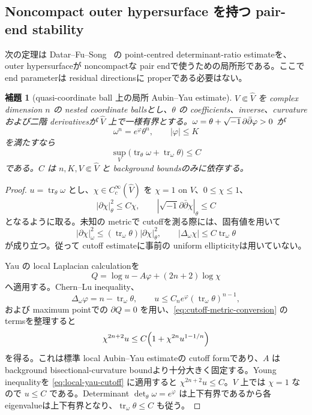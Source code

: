 \documentclass[11pt,a4paper]{ltjsarticle}
\newcommand{\tr}{\operatorname{tr}}\newcommand{\id}{\operatorname{id}}
\theoremstyle{plain}
\newtheorem{lemma}[theorem]{補題}\newtheorem{corollary}[theorem]{系}
\theoremstyle{definition}
\theoremstyle{remark}
\begin{document}
\subsection{Noncompact outer hypersurface を持つ pair-end stability}
次の定理は Datar--Fu--Song~\cite{DFS} の point-centred determinant-ratio estimateを、outer hypersurfaceが noncompactな pair endで使うための局所形である。ここで end parameterは residual directionsに properである必要はない。

\begin{lemma}[quasi-coordinate ball 上の局所 Aubin--Yau estimate]\label{lem:local-aubin-yau}
$V\Subset\widehat V$ を complex dimension $n$ の nested coordinate ballsとし、$\theta$ の coefficients、inverse、curvatureおよび二階 derivativesが $\widehat V$ 上で一様有界とする。$\omega=\theta+\sqrt{-1}\,\partial\bar\partial\varphi>0$ が
\[
 \omega^n=e^{\varphi}\theta^n,
 \qquad |\varphi|\le K
\]
を満たすなら
\[
 \sup_V\bigl(\tr_\theta\omega+\tr_\omega\theta\bigr)\le C
\]
である。$C$ は $n,K,V\Subset\widehat V$ と background boundsのみに依存する。
\end{lemma}

\begin{proof}
$u=\tr_\theta\omega$ とし、$\chi\in C_c^\infty(\widehat V)$ を $\chi=1$ on $V$、$0\le\chi\le1$、
\[
 |\partial\chi|_\theta^2\le C\chi,
 \qquad
 |\sqrt{-1}\partial\bar\partial\chi|_\theta\le C
\]
となるように取る。未知の metricで cutoffを測る際には、固有値を用いて
\begin{equation}\label{eq:cutoff-metric-conversion}
 |\partial\chi|_\omega^2
 \le (\tr_\omega\theta)|\partial\chi|_\theta^2,
 \qquad
 |\Delta_\omega\chi|
 \le C\tr_\omega\theta
\end{equation}
が成り立つ。従って cutoff estimateに事前の uniform ellipticityは用いていない。

Yau の local Laplacian calculationを
\[
 Q=\log u-A\varphi+(2n+2)\log\chi
\]
へ適用する。Chern--Lu inequality、
\[
 \Delta_\omega\varphi=n-\tr_\omega\theta,
 \qquad
 u\le C_n e^{\varphi}(\tr_\omega\theta)^{n-1},
\]
および maximum pointでの $\partial Q=0$ を用い、\eqref{eq:cutoff-metric-conversion} の termsを整理すると
\begin{equation}\label{eq:local-yau-cutoff}
 \chi^{2n+2}u
 \le C\Bigl(1+\chi^{2n}u^{1-1/n}\Bigr)
\end{equation}
を得る。これは標準 local Aubin--Yau estimateの cutoff formであり、$A$ は background bisectional-curvature boundより十分大きく固定する。Young inequalityを \eqref{eq:local-yau-cutoff} に適用すると $\chi^{2n+2}u\le C$。$V$ 上では $\chi=1$ なので $u\le C$ である。Determinant $\det_\theta\omega=e^{\varphi}$ は上下有界であるから各 eigenvalueは上下有界となり、$\tr_\omega\theta\le C$ も従う。
\end{proof}
\end{document}
